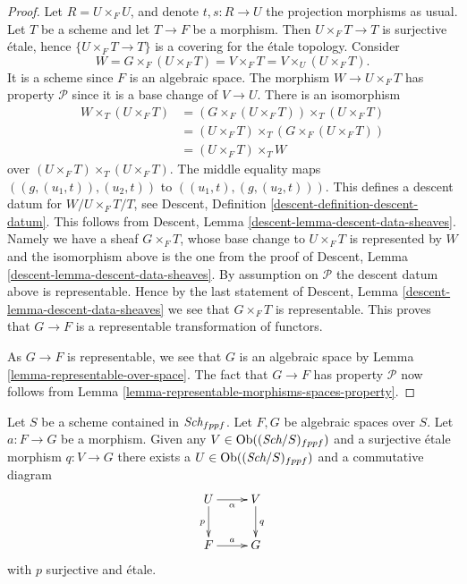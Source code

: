 \begin{proof}
Let $R = U \times_F U$, and denote $t, s : R \to U$ the projection morphisms
as usual. Let $T$ be a scheme and let $T \to F$ be a morphism. Then
$U \times_F T \to T$ is surjective \'etale, hence $\{U \times_F T \to T\}$ is
a covering for the \'etale topology. Consider
$$
W = G \times_F (U \times_F T) = V \times_F T = V \times_U (U \times_F T).
$$
It is a scheme since $F$ is an algebraic space. The morphism
$W \to U \times_F T$ has property $\mathcal{P}$ since it is a
base change of $V \to U$. There is an isomorphism
\begin{align*}
W \times_T (U \times_F T) & =
(G \times_F (U \times_F T)) \times_T (U \times_F T) \\
& = (U \times_F T) \times_T (G \times_F (U \times_F T)) \\
& = (U \times_F T) \times_T W
\end{align*}
over $(U \times_F T) \times_T (U \times_F T)$. The middle equality maps
$((g, (u_1, t)), (u_2, t))$ to $((u_1, t), (g, (u_2, t)))$.
This defines a descent datum for $W/U \times_F T/T$, see
Descent, Definition \ref{descent-definition-descent-datum}.
This follows from
Descent, Lemma \ref{descent-lemma-descent-data-sheaves}.
Namely we have a sheaf $G \times_F T$, whose
base change to $U \times_F T$ is represented by $W$ and the isomorphism
above is the one from the proof of
Descent, Lemma \ref{descent-lemma-descent-data-sheaves}.
By assumption on $\mathcal{P}$ the descent datum above is representable.
Hence by the last statement of
Descent, Lemma \ref{descent-lemma-descent-data-sheaves}
we see that $G \times_F T$ is representable. This proves that
$G \to F$ is a representable transformation of functors.

\medskip\noindent
As $G \to F$ is representable, we see that $G$ is an algebraic space by
Lemma \ref{lemma-representable-over-space}. The fact that $G \to F$ has
property $\mathcal{P}$ now follows from
Lemma \ref{lemma-representable-morphisms-spaces-property}.
\end{proof}

\begin{lemma}
\label{lemma-lift-morphism-presentations}
Let $S$ be a scheme contained in $\textit{Sch}_{fppf}$.
Let $F, G$ be algebraic spaces over $S$.
Let $a : F \to G$ be a morphism.
Given any $V \in \mathop{\rm Ob}\nolimits((\textit{Sch}/S)_{fppf})$
and a surjective \'etale morphism $q : V \to G$ there exists
a $U \in \mathop{\rm Ob}\nolimits((\textit{Sch}/S)_{fppf})$
and a commutative diagram
$$
\xymatrix{
U \ar[d]_p \ar[r]_\alpha &
V \ar[d]^q \\
F \ar[r]^a & G
}
$$
with $p$ surjective and \'etale.
\end{lemma}

